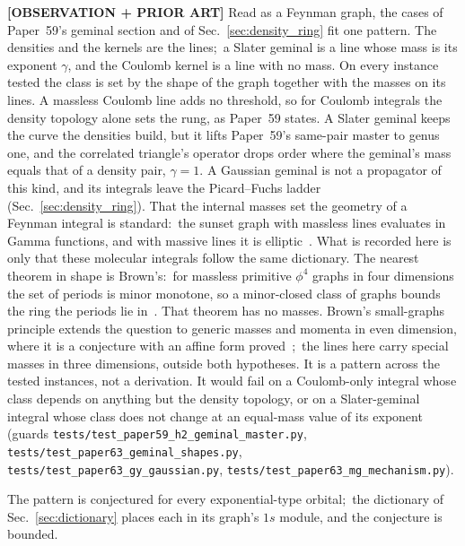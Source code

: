 \documentclass[aps,pra,twocolumn,superscriptaddress,longbibliography]{revtex4-2}
\begin{document}
\textbf{[OBSERVATION + PRIOR ART]} Read as a Feynman graph, the cases of Paper~59's geminal section and of
Sec.~\ref{sec:density_ring} fit one pattern.  The densities and the kernels are the lines;\ a
Slater geminal is a line whose mass is its exponent $\gamma$, and the Coulomb kernel is a line
with no mass.  On every instance tested the class is set by the shape of the graph together
with the masses on its lines.  A massless Coulomb line adds no threshold, so for Coulomb
integrals the density topology alone sets the rung, as Paper~59 states.  A Slater geminal keeps
the curve the densities build, but it lifts Paper~59's same-pair master to genus one, and the
correlated triangle's operator drops order where the geminal's mass equals that of a density
pair, $\gamma=1$.  A Gaussian geminal is not a propagator of this kind, and its integrals leave
the Picard--Fuchs ladder (Sec.~\ref{sec:density_ring}).  That the internal masses set the
geometry of a Feynman integral is standard:\ the sunset graph with massless lines evaluates in
Gamma functions, and with massive lines it is elliptic~\cite{blochvanhove2015,vanhove2014}.
What is recorded here is only that these molecular integrals follow the same dictionary.  The
nearest theorem in shape is Brown's:\ for massless primitive $\phi^{4}$ graphs in four
dimensions the set of periods is minor monotone, so a minor-closed class of graphs bounds the
ring the periods lie in~\cite{brown2009periods}.  That theorem has no masses.  Brown's small-graphs principle extends the
question to generic masses and momenta in even dimension, where it is a
conjecture with an affine form proved~\cite{brown2015coaction};\ the lines
here carry special masses in three dimensions, outside both hypotheses.  It is
a pattern across the tested instances, not a derivation.  It would fail on a Coulomb-only
integral whose class depends on anything but the density topology, or on a Slater-geminal
integral whose class does not change at an equal-mass value of its exponent (guards
\texttt{tests/test\_paper59\_h2\_geminal\_master.py},
\texttt{tests/test\_paper63\_geminal\_shapes.py},
\texttt{tests/test\_paper63\_gy\_gaussian.py},
\texttt{tests/test\_paper63\_mg\_mechanism.py}).


The pattern is conjectured for every exponential-type orbital;\ the
dictionary of Sec.~\ref{sec:dictionary} places each in its graph's $1s$
module, and the conjecture is bounded.
\end{document}
